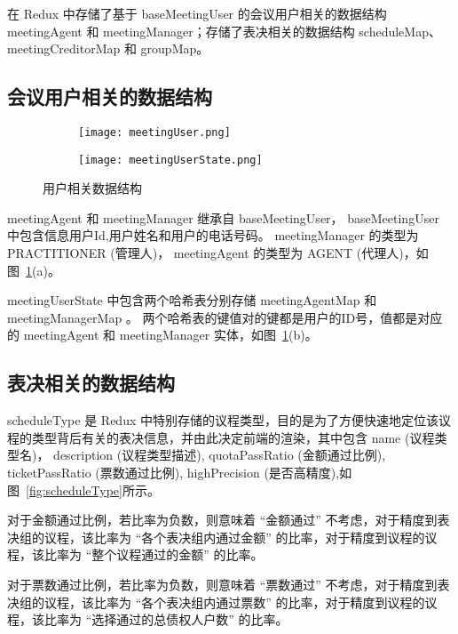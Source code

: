   在 Redux 中存储了基于 baseMeetingUser 的会议用户相关的数据结构 meetingAgent 和 meetingManager；存储了表决相关的数据结构 scheduleMap、meetingCreditorMap 和 groupMap。

  \subsection{会议用户相关的数据结构}

  \begin{figure}[!htp]
    \centering
    \begin{subfigure}{0.6\textwidth}
      \centering
      \texttt{[image: meetingUser.png]}
      \caption{}
    \end{subfigure}
    \hspace{1cm}
    \begin{subfigure}{0.3\textwidth}
      \centering
      \texttt{[image: meetingUserState.png]}
      \caption{}
    \end{subfigure}
    \caption{用户相关数据结构}
    \label{fig:meetingUser}
  \end{figure}

  meetingAgent 和 meetingManager 继承自 baseMeetingUser， baseMeetingUser 中包含信息用户Id,用户姓名和用户的电话号码。 meetingManager 的类型为 PRACTITIONER (管理人)， meetingAgent 的类型为 AGENT (代理人)，如图~\ref{fig:meetingUser}(a)。

  meetingUserState 中包含两个哈希表分别存储 meetingAgentMap 和
  meetingManagerMap 。 两个哈希表的键值对的键都是用户的ID号，值都是对应的 meetingAgent 和 meetingManager 实体，如图~\ref{fig:meetingUser}(b)。

  \subsection{表决相关的数据结构}

  scheduleType 是 Redux 中特别存储的议程类型，目的是为了方便快速地定位该议程的类型背后有关的表决信息，并由此决定前端的渲染，其中包含 name (议程类型名)， description (议程类型描述), quotaPassRatio (金额通过比例), ticketPassRatio (票数通过比例), highPrecision (是否高精度),如图~\ref{fig:scheduleType}所示。

  对于金额通过比例，若比率为负数，则意味着 “金额通过” 不考虑，对于精度到表决组的议程，该比率为 “各个表决组内通过金额” 的比率，对于精度到议程的议程，该比率为 “整个议程通过的金额” 的比率。

  对于票数通过比例，若比率为负数，则意味着 “票数通过” 不考虑，对于精度到表决组的议程，该比率为 “各个表决组内通过票数” 的比率，对于精度到议程的议程，该比率为 “选择通过的总债权人户数” 的比率。

